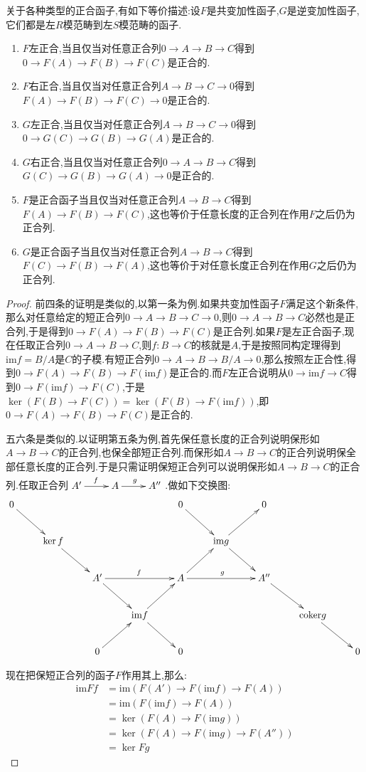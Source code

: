 关于各种类型的正合函子,有如下等价描述:设$F$是共变加性函子,$G$是逆变加性函子,它们都是左$R$模范畴到左$S$模范畴的函子.
\begin{enumerate}
	\item $F$左正合,当且仅当对任意正合列$0\to A\to B\to C$得到$0\to F(A)\to F(B)\to F(C)$是正合的.
	\item $F$右正合,当且仅当对任意正合列$A\to B\to C\to0$得到$F(A)\to F(B)\to F(C)\to0$是正合的.
	\item $G$左正合,当且仅当对任意正合列$A\to B\to C\to0$得到$0\to G(C)\to G(B)\to G(A)$是正合的.
	\item $G$右正合,当且仅当对任意正合列$0\to A\to B\to C$得到$G(C)\to G(B)\to G(A)\to0$是正合的.
	\item $F$是正合函子当且仅当对任意正合列$A\to B\to C$得到$F(A)\to F(B)\to F(C)$,这也等价于任意长度的正合列在作用$F$之后仍为正合列.
	\item $G$是正合函子当且仅当对任意正合列$A\to B\to C$得到$F(C)\to F(B)\to F(A)$,这也等价于对任意长度正合列在作用$G$之后仍为正合列.
\end{enumerate}
\begin{proof}
	
	前四条的证明是类似的,以第一条为例.如果共变加性函子$F$满足这个新条件,那么对任意给定的短正合列$0\to A\to B\to C\to0$,则$0\to A\to B\to C$必然也是正合列,于是得到$0\to F(A)\to F(B)\to F(C)$是正合列.如果$F$是左正合函子,现在任取正合列$0\to A\to B\to C$,则$f:B\to C$的核就是$A$,于是按照同构定理得到$\mathrm{im}f=B/A$是$C$的子模.有短正合列$0\to A\to B\to B/A\to0$,那么按照左正合性,得到$0\to F(A)\to F(B)\to F(\mathrm{im}f)$是正合的.而$F$左正合说明从$0\to\mathrm{im}f\to C$得到$0\to F(\mathrm{im}f)\to F(C)$,于是$\ker(F(B)\to F(C))=\ker(F(B)\to F(\mathrm{im}f))$,即$0\to F(A)\to F(B)\to F(C)$是正合的.
	
	五六条是类似的.以证明第五条为例,首先保任意长度的正合列说明保形如$A\to B\to C$的正合列,也保全部短正合列.而保形如$A\to B\to C$的正合列说明保全部任意长度的正合列.于是只需证明保短正合列可以说明保形如$A\to B\to C$的正合列.任取正合列$\xymatrix{A'\ar[r]^f&A\ar[r]^g&A''}$.做如下交换图:
	$$\xymatrix{
		0\ar[dr]&&&&0\ar[dr]&&0&&\\
		&\ker f\ar[dr]&&&&\mathrm{im}g\ar[ur]\ar[dr]&&&\\
		&&A'\ar[rr]^f\ar[dr]&&A\ar[rr]^g\ar[ur]&&A''\ar[dr]&&\\
		&&&\mathrm{im}f\ar[ur]\ar[dr]&&&&\mathrm{coker}g\ar[dr]&\\
		&&0\ar[ur]&&0&&&&0
	}$$
	
	现在把保短正合列的函子$F$作用其上,那么:
	\begin{align*}
	\mathrm{im}Ff&=\mathrm{im}\left(F(A')\to F(\mathrm{im}f)\to F(A)\right)  \\
	&= \mathrm{im}\left(F(\mathrm{im}f)\to F(A)\right) \\
	&= \ker\left(F(A)\to F(\mathrm{im}g)\right) \\
	&= \ker\left(F(A)\to F(\mathrm{im}g)\to F(A'')\right) \\
	&= \ker Fg
	\end{align*}
\end{proof}

